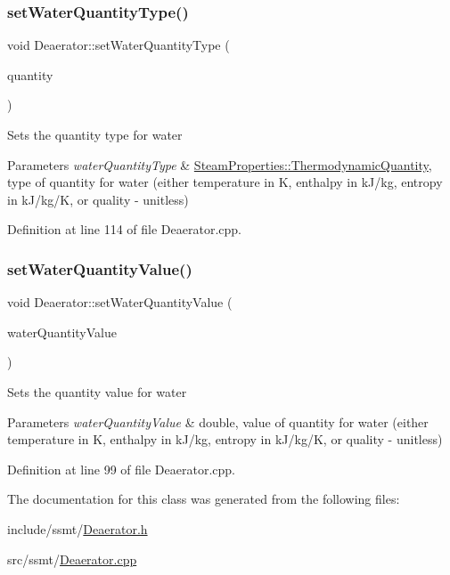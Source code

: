 \subsubsection{\texorpdfstring{set\+Water\+Quantity\+Type()}{setWaterQuantityType()}}
{\footnotesize\ttfamily void Deaerator\+::set\+Water\+Quantity\+Type (\begin{DoxyParamCaption}\item[{\hyperlink{class_steam_properties_ae0294bedf7d178c2d8fb6aed0f62fbff}{Steam\+Properties\+::\+Thermodynamic\+Quantity}}]{quantity }\end{DoxyParamCaption})}

Sets the quantity type for water 
\begin{DoxyParams}{Parameters}
{\em water\+Quantity\+Type} & \hyperlink{class_steam_properties_ae0294bedf7d178c2d8fb6aed0f62fbff}{Steam\+Properties\+::\+Thermodynamic\+Quantity}, type of quantity for water (either temperature in K, enthalpy in k\+J/kg, entropy in k\+J/kg/K, or quality -\/ unitless) \\
\hline
\end{DoxyParams}


Definition at line 114 of file Deaerator.\+cpp.

\mbox{\label{class_deaerator_ac31cf2deb8bf30ee6921d1d9f8281eb8}} 
\subsubsection{\texorpdfstring{set\+Water\+Quantity\+Value()}{setWaterQuantityValue()}}
{\footnotesize\ttfamily void Deaerator\+::set\+Water\+Quantity\+Value (\begin{DoxyParamCaption}\item[{double}]{water\+Quantity\+Value }\end{DoxyParamCaption})}

Sets the quantity value for water 
\begin{DoxyParams}{Parameters}
{\em water\+Quantity\+Value} & double, value of quantity for water (either temperature in K, enthalpy in k\+J/kg, entropy in k\+J/kg/K, or quality -\/ unitless) \\
\hline
\end{DoxyParams}


Definition at line 99 of file Deaerator.\+cpp.



The documentation for this class was generated from the following files\+:\begin{DoxyCompactItemize}
\item 
include/ssmt/\hyperlink{_deaerator_8h}{Deaerator.\+h}\item 
src/ssmt/\hyperlink{_deaerator_8cpp}{Deaerator.\+cpp}\end{DoxyCompactItemize}

